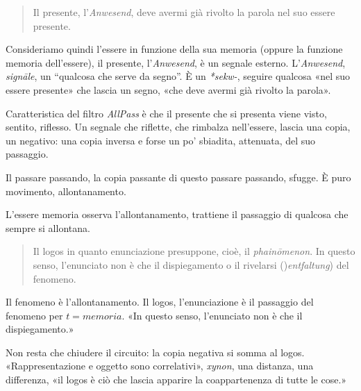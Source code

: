 \documentclass{../../lib/gs}
\begin{document}
\begin{quote}
  \begin{sf}
    \small
    Il presente, l'\emph{Anwesend}, deve avermi già rivolto la parola nel suo
    essere presente.
  \end{sf}
\end{quote}

\begin{figure}[ht]
  \centering
  \label{tikz:ciclobase}
\end{figure}

Consideriamo quindi l'essere in funzione della sua memoria (oppure la funzione
memoria dell'essere), il presente, l'\emph{Anwesend}, è un segnale esterno.
L'\emph{Anwesend}, \emph{signāle}, un “qualcosa che serve da segno”. È un
\emph{*sekw-}, seguire qualcosa «nel suo essere presente» che lascia un segno,
«che deve avermi già rivolto la parola».

Caratteristica del filtro \emph{AllPass} è che il presente che si presenta viene
visto, sentito, riflesso. Un segnale che riflette, che rimbalza nell'essere,
lascia una copia, un negativo: una copia inversa e forse un po' sbiadita,
attenuata, del suo passaggio.

Il passare passando, la copia passante di questo passare passando, sfugge. È
puro movimento, allontanamento.

L'essere memoria osserva l'allontanamento, trattiene il passaggio di qualcosa
che sempre si allontana.

\begin{quote}
  \begin{sf}
    \small
    Il logos in quanto enunciazione presuppone, cioè, il \emph{phainōmenon}. In
    questo senso, l'enunciato non è che il dispiegamento o il rivelarsi
    ()\emph{entfaltung}) del fenomeno.
  \end{sf}
\end{quote}

Il fenomeno è l'allontanamento. Il logos, l'enunciazione è il passaggio del
fenomeno per $t=memoria$. «In questo senso, l'enunciato non è che il
dispiegamento.»

Non resta che chiudere il circuito: la copia negativa si somma al logos.
«Rappresentazione e oggetto sono correlativi», \emph{xynon}, una distanza,
una differenza, «il logos è ciò che lascia apparire la coappartenenza di tutte
le cose.»
\end{document}
